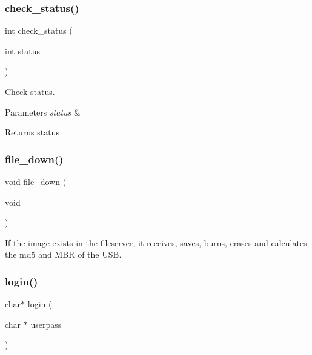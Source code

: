 \mbox{\label{client_8h_af8b753753a0d32bcef5a40e1a49b7a18}} 
\subsubsection{check\+\_\+status()}
{\footnotesize\ttfamily int check\+\_\+status (\begin{DoxyParamCaption}\item[{int}]{status }\end{DoxyParamCaption})}



Check status. 


\begin{DoxyParams}{Parameters}
{\em status} & \\
\hline
\end{DoxyParams}
\begin{DoxyReturn}{Returns}
status 
\end{DoxyReturn}
\mbox{\label{client_8h_aacd5c156cb2388028cddb5242f1fe5c2}} 
\subsubsection{file\+\_\+down()}
{\footnotesize\ttfamily void file\+\_\+down (\begin{DoxyParamCaption}\item[{void}]{ }\end{DoxyParamCaption})}



If the image exists in the fileserver, it receives, saves, burns, erases and calculates the md5 and M\+BR of the U\+SB. 

\mbox{\label{client_8h_a184b4ae1814dc2cdcea053bafd7f097f}} 
\subsubsection{login()}
{\footnotesize\ttfamily char$\ast$ login (\begin{DoxyParamCaption}\item[{char $\ast$}]{userpass }\end{DoxyParamCaption})}



